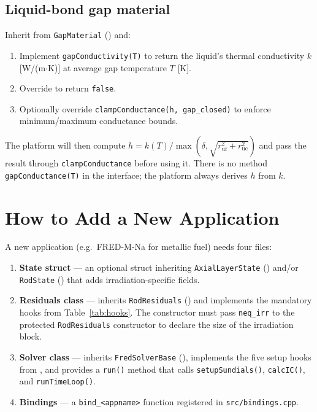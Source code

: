 \documentclass[11pt,a4paper]{article}
\begin{document}
\subsection{Liquid-bond gap material}

Inherit from \texttt{GapMaterial} () and:
\begin{enumerate}
  \item Implement \texttt{gapConductivity(T)} to return the liquid's thermal conductivity $k$ [W/(m$\cdot$K)] at average gap temperature $T$ [K].
  \item Override  to return \texttt{false}.
  \item Optionally override \texttt{clampConductance(h, gap\_closed)} to enforce minimum/maximum conductance bounds.
\end{enumerate}
The platform will then compute $h = k(T) / \max(\delta, \sqrt{r_\mathrm{uf}^2+r_\mathrm{uc}^2})$ and pass the result through \texttt{clampConductance} before using it. There is no method \texttt{gapConductance(T)} in the interface; the platform always derives $h$ from $k$.

\section{How to Add a New Application}
\label{sec:new_app}

A new application (e.g.\ FRED-M-Na for metallic fuel) needs four files:

\begin{enumerate}
  \item \textbf{State struct} — an optional struct inheriting \texttt{AxialLayerState} () and/or \texttt{RodState} () that adds irradiation-specific fields.
  \item \textbf{Residuals class} — inherits \texttt{RodResiduals} () and implements the mandatory hooks from Table~\ref{tab:hooks}.  The constructor must pass \texttt{neq\_irr} to the protected \texttt{RodResiduals} constructor to declare the size of the irradiation block.
  \item \textbf{Solver class} — inherits \texttt{FredSolverBase} (), implements the five setup hooks from , and provides a \texttt{run()} method that calls \texttt{setupSundials()}, \texttt{calcIC()}, and \texttt{runTimeLoop()}.
  \item \textbf{Bindings} — a \texttt{bind\_<appname>} function registered in \texttt{src/bindings.cpp}.
\end{enumerate}
\end{document}
